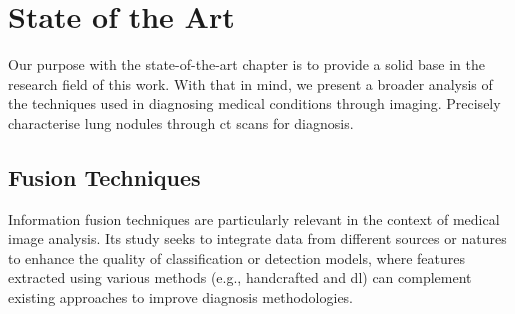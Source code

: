 




\chapter{State of the Art}\label{chap:sota}
Our purpose with the state-of-the-art chapter is to provide a solid base in the research field of this work. With that in mind, we present a broader analysis of the techniques used in diagnosing medical conditions through imaging. Precisely characterise lung nodules through \ac{ct} scans for diagnosis.

\section{Fusion Techniques}
Information fusion techniques are particularly relevant in the context of medical image analysis. Its study seeks to integrate data from different sources or natures to enhance the quality of classification or detection models, where features extracted using various methods (e.g., handcrafted and \ac{dl}) can complement existing approaches to improve diagnosis methodologies.


